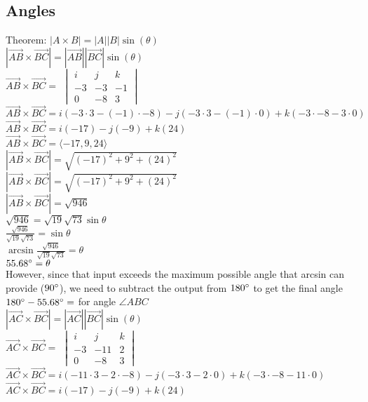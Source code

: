 \documentclass{article}
\begin{document}
\subsection{Angles}
Theorem: $|A\times B|=|A||B|\sin(\theta)$
\\[0.1in]$|\vec{AB}\times \vec{BC}|=|\vec{AB}||\vec{BC}|\sin(\theta)$
\\[0.1in]$\vec{AB} \times \vec{BC} = $
$\begin{vmatrix}
i & j & k \\
-3 & -3 & -1 \\
0 & -8 & 3
\end{vmatrix}$
\\[0.1in]$\vec{AB} \times \vec{BC} = i(-3\cdot3-(-1)\cdot -8)-j(-3\cdot 3-(-1)\cdot 0)+k(-3\cdot-8-3\cdot 0)$
\\[0.1in]$\vec{AB} \times \vec{BC} = i(-17)-j(-9)+k(24)$
\\[0.1in]$\vec{AB} \times \vec{BC} = \langle-17,9,24\rangle$
\\[0.1in]$|\vec{AB} \times \vec{BC}| = \sqrt{(-17)^2+9^2+(24)^2}$
\\[0.1in]$|\vec{AB} \times \vec{BC}| = \sqrt{(-17)^2+9^2+(24)^2}$
\\[0.1in]$|\vec{AB} \times \vec{BC}| = \sqrt{946}$
\\[0.1in]$\sqrt{946}=\sqrt{19}\sqrt{73}\sin\theta$
\\[0.1in]$\frac{\sqrt{946}}{\sqrt{19}\sqrt{73}}=\sin\theta$
\\[0.1in]$\arcsin\frac{\sqrt{946}}{\sqrt{19}\sqrt{73}}=\theta$
\\[0.1in]$55.68\degree=\theta$ 
\\[0.1in]However, since that input exceeds the maximum possible angle that arcsin can provide ($90\degree$), we need to subtract the output from $180\degree$ to get the final angle
\\[0.1in]$180\degree-55.68\degree=$ \boxed{\theta =124.32\degree} for angle $\angle ABC$
\\[0.1in]$|\vec{AC}\times \vec{BC}|=|\vec{AC}||\vec{BC}|\sin(\theta)$
\\[0.1in]$\vec{AC} \times \vec{BC} = $
$\begin{vmatrix}
i & j & k \\
-3 & -11 & 2 \\
0 & -8 & 3
\end{vmatrix}$
\\[0.1in]$\vec{AC} \times \vec{BC} = i(-11\cdot3-2\cdot -8)-j(-3\cdot 3-2\cdot 0)+k(-3\cdot-8-11\cdot 0)$
\\[0.1in]$\vec{AC} \times \vec{BC} = i(-17)-j(-9)+k(24)$
\end{document}
